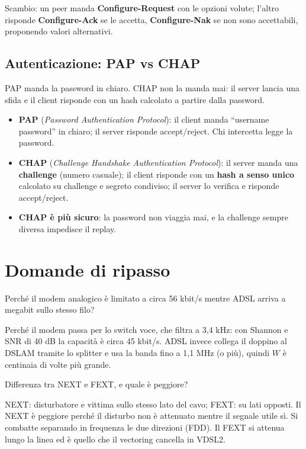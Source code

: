 Scambio: un peer manda \textbf{Configure-Request} con le opzioni volute; l'altro risponde \textbf{Configure-Ack} se le accetta, \textbf{Configure-Nak} se non sono accettabili, proponendo valori alternativi.

\subsection{Autenticazione: PAP vs CHAP}

\begin{inbreve}

PAP manda la password in chiaro. CHAP non la manda mai: il server lancia una sfida e il client risponde con un hash calcolato a partire dalla password.

\end{inbreve}

\begin{itemize}
\tightlist
\item
  \textbf{PAP} (\emph{Password Authentication Protocol}): il client manda ``username password'' in chiaro; il server risponde accept/reject. Chi intercetta legge la password.
\item
  \textbf{CHAP} (\emph{Challenge Handshake Authentication Protocol}): il server manda una \textbf{challenge} (numero casuale); il client risponde con un \textbf{hash a senso unico} calcolato su challenge e segreto condiviso; il server lo verifica e risponde accept/reject.
\item
  \textbf{CHAP è più sicuro}: la password non viaggia mai, e la challenge sempre diversa impedisce il replay.
\end{itemize}

\section{Domande di ripasso}

\begin{approfondimento}{Perché il modem analogico è limitato a circa 56 kbit/s mentre ADSL
arriva a megabit sullo stesso filo?}

Perché il modem passa per lo switch voce, che filtra a 3,4 kHz: con Shannon e SNR di 40 dB la capacità è circa 45 kbit/s. ADSL invece collega il doppino al DSLAM tramite lo splitter e usa la banda fino a 1,1 MHz (o più), quindi \(W\) è centinaia di volte più grande.

\end{approfondimento}

\begin{approfondimento}{Differenza tra NEXT e FEXT, e quale è peggiore?}

NEXT: disturbatore e vittima sullo stesso lato del cavo; FEXT: su lati opposti. Il NEXT è peggiore perché il disturbo non è attenuato mentre il segnale utile sì. Si combatte separando in frequenza le due direzioni (FDD). Il FEXT si attenua lungo la linea ed è quello che il vectoring cancella in VDSL2.

\end{approfondimento}

